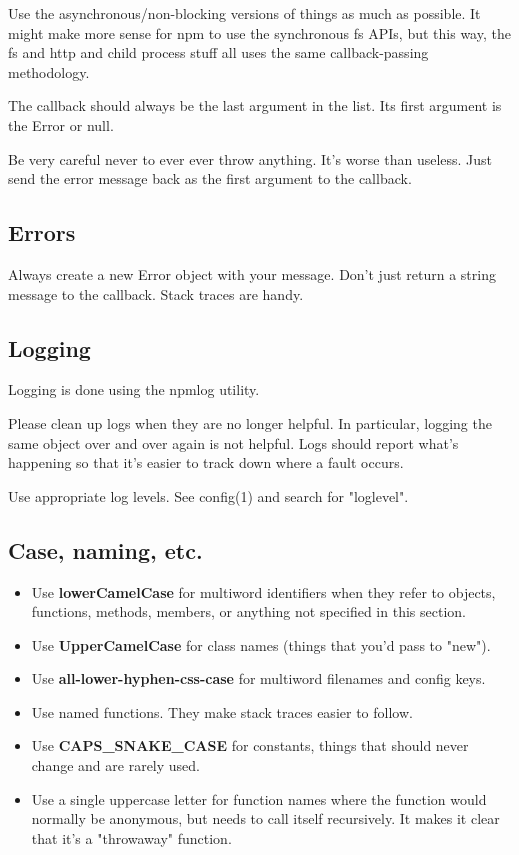 Use the asynchronous/non-blocking versions of things as much as possible. It might make more sense for npm to use the synchronous fs APIs, but this way, the fs and http and child process stuff all uses the same callback-passing methodology.

The callback should always be the last argument in the list. Its first argument is the Error or null.

Be very careful never to ever ever throw anything. It's worse than useless. Just send the error message back as the first argument to the callback.

\subsection{Errors}

Always create a new Error object with your message. Don't just return a string message to the callback. Stack traces are handy.

\subsection{Logging}

Logging is done using the npmlog utility.

Please clean up logs when they are no longer helpful. In particular, logging the same object over and over again is not helpful. Logs should report what's happening so that it's easier to track down where a fault occurs.

Use appropriate log levels. See config(1) and search for "loglevel".

\subsection{Case, naming, etc.}

\begin{itemize}
  \item Use \textbf{lowerCamelCase} for multiword identifiers when they refer to objects, functions, methods, members, or anything not specified in this section.
  \item Use \textbf{UpperCamelCase} for class names (things that you'd pass to "new"). 
  \item Use \textbf{all-lower-hyphen-css-case} for multiword filenames and config keys.
  \item Use named functions. They make stack traces easier to follow.
  \item Use \textbf{CAPS\_SNAKE\_CASE} for constants, things that should never change and are rarely used.
  \item Use a single uppercase letter for function names where the function would normally be anonymous, but needs to call itself recursively. It makes it clear that it's a "throwaway" function.
\end{itemize}

